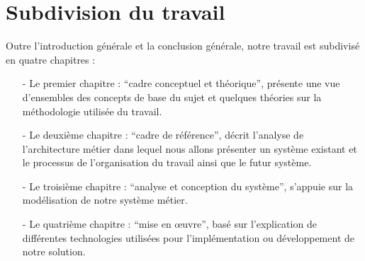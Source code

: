 \documentclass[a4paper,12pt,oneside]{book}
\begin{document}
        \section[Subdivision du travail]{Subdivision du travail}
        Outre l’introduction générale et la conclusion générale, notre travail est subdivisé
        en quatre chapitres :
        \newline
            \begin{itemize}
                \item [-] Le premier chapitre : \enquote{cadre conceptuel et théorique}, présente une vue
                d’ensembles des concepts de base du sujet et quelques théories sur la méthodologie
                utilisée du travail.
                \newline
                \item [-] Le deuxième chapitre : \enquote{cadre de référence}, décrit l’analyse de l’architecture
                métier dans lequel nous allons présenter un système existant et le processus de
                l’organisation du travail ainsi que le futur système.
                \newline       
                \item [-] Le troisième chapitre : \enquote{analyse et conception du système}, s’appuie sur la
                modélisation de notre système métier.
                \newline
                \item [-]Le quatrième chapitre : \enquote{mise en œuvre}, basé sur l’explication de différentes
                technologies utilisées pour l’implémentation ou développement de notre solution.            
            \end{itemize}

        \printbibliography
\end{document}
